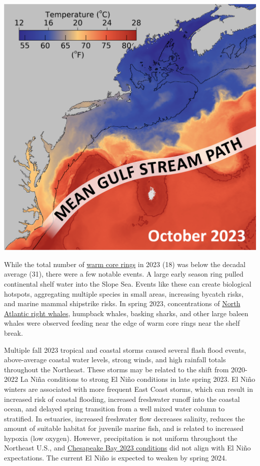 \documentclass[
  10pt,
]{article}
\let\origfigure\figure
\let\endorigfigure\endfigure
\renewenvironment{figure}[1][2] {
    \expandafter\origfigure\expandafter[H]
} {
    \endorigfigure
}
\begin{document}
\begin{figure}

{\centering \includegraphics[width=0.6\linewidth]{images/MAP-SST-Gulf-Stream} 

}

\caption{Weekly mean sea surface temperature (October 8-10, 2023) with the long-term mean Gulf Stream position. Red lines represent the 26°C) (78.8°F temperature contour.}\label{fig:gulf-stream-2023}
\end{figure}

While the total number of \href{https://noaa-edab.github.io/catalog/warm-core-rings.html}{warm core rings} in 2023 (18) was below the decadal average (31), there were a few notable events. A large early season ring pulled continental shelf water into the Slope Sea. Events like these can create biological hotspots, aggregating multiple species in small areas, increasing bycatch risks, and marine mammal shipstrike risks. In spring 2023, concentrations of \href{https://noaa-edab.github.io/catalog/persistent-annual-hotspots.html?q=hotspo\#persistent-annual-hotspots}{North Atlantic right whales}, humpback whales, basking sharks, and other large baleen whales were observed feeding near the edge of warm core rings near the shelf break.

Multiple fall 2023 tropical and coastal storms caused several flash flood events, above-average coastal water levels, strong winds, and high rainfall totals throughout the Northeast. These storms may be related to the shift from 2020-2022 La Niña conditions to strong El Niño conditions in late spring 2023. El Niño winters are associated with more frequent East Coast storms, which can result in increased risk of coastal flooding, increased freshwater runoff into the coastal ocean, and delayed spring transition from a well mixed water column to stratified. In estuaries, increased freshwater flow decreases salinity, reduces the amount of suitable habitat for juvenile marine fish, and is related to increased hypoxia (low oxygen). However, precipitation is not uniform throughout the Northeast U.S., and \href{https://noaa-edab.github.io/catalog/chesapeake-bay-salinity.html}{Chesapeake Bay 2023 conditions} did not align with El Niño expectations. The current El Niño is expected to weaken by spring 2024.
\end{document}
